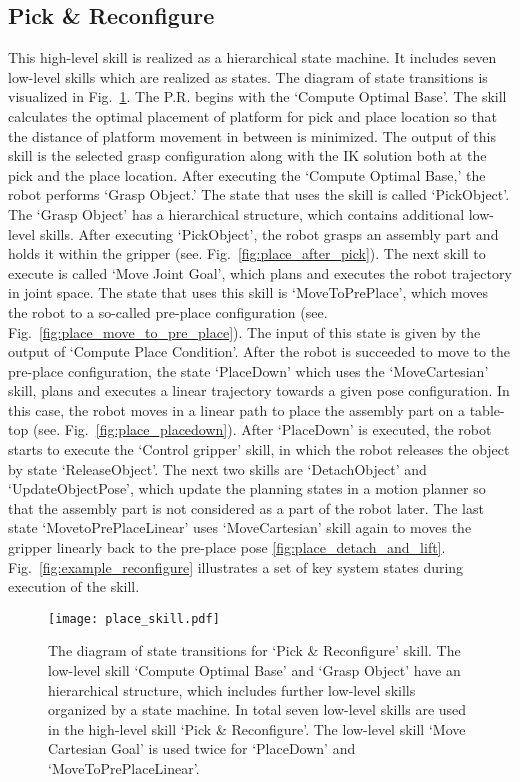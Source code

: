 \subsection{Pick \& Reconfigure}
This high-level skill is realized as a hierarchical state machine. It includes seven low-level skills which are realized as states. The diagram of state transitions is visualized in Fig.~\ref{fig:place_skill}. The P.R. begins with the `Compute Optimal Base'. The skill calculates the optimal placement of platform for pick and place location so that the distance of platform movement in between is minimized. The output of this skill is the selected grasp configuration along with the IK solution both at the pick and the place location. After executing the `Compute Optimal Base,' the robot performs `Grasp Object.' The state that uses the skill is called `PickObject'. The `Grasp Object' has a hierarchical structure, which contains additional low-level skills. After executing `PickObject', the robot grasps an assembly part and holds it within the gripper (see. Fig.~\ref{fig:place_after_pick}). The next skill to execute is called `Move Joint Goal', which plans and executes the robot trajectory in joint space. The state that uses this skill is `MoveToPrePlace', which moves the robot to a so-called pre-place configuration (see. Fig.~\ref{fig:place_move_to_pre_place}). The input of this state is given by the output of `Compute Place Condition'. After the robot is succeeded to move to the pre-place configuration, the state `PlaceDown' which uses the `MoveCartesian' skill, plans and executes a linear trajectory towards a given pose configuration. In this case, the robot moves in a linear path to place the assembly part on a table-top (see. Fig.~\ref{fig:place_placedown}). After `PlaceDown' is executed, the robot starts to execute the `Control gripper' skill, in which the robot releases the object by state `ReleaseObject'. The next two skills are `DetachObject' and `UpdateObjectPose', which update the planning states in a motion planner so that the assembly part is not considered as a part of the robot later. The last state `MovetoPrePlaceLinear' uses `MoveCartesian' skill again to moves the gripper linearly back to the pre-place pose \ref{fig:place_detach_and_lift}.  Fig.~\ref{fig:example_reconfigure} illustrates a set of key system states during execution of the skill.

\begin{figure}[!htbp]
\centering
\texttt{[image: place\_skill.pdf]}
\captionsetup{justification=raggedright}
\caption{The diagram of state transitions for `Pick \& Reconfigure' skill. The low-level skill `Compute Optimal Base' and `Grasp Object' have an hierarchical structure, which includes further low-level skills organized by a state machine. In total seven low-level skills are used in the high-level skill `Pick \& Reconfigure'. The low-level skill `Move Cartesian Goal' is used twice for `PlaceDown' and `MoveToPrePlaceLinear'.}
\label{fig:place_skill}
\end{figure}

